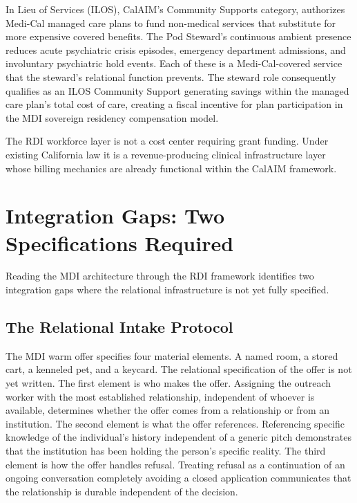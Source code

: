 \documentclass[12pt, letterpaper]{article}
\begin{document}
In Lieu of Services (ILOS), CalAIM's Community Supports category, authorizes Medi-Cal managed care plans to fund non-medical services that substitute for more expensive covered benefits. The Pod Steward's continuous ambient presence reduces acute psychiatric crisis episodes, emergency department admissions, and involuntary psychiatric hold events. Each of these is a Medi-Cal-covered service that the steward's relational function prevents. The steward role consequently qualifies as an ILOS Community Support generating savings within the managed care plan's total cost of care, creating a fiscal incentive for plan participation in the MDI sovereign residency compensation model.

The RDI workforce layer is not a cost center requiring grant funding. Under existing California law it is a revenue-producing clinical infrastructure layer whose billing mechanics are already functional within the CalAIM framework.

\clearpage
\section{Integration Gaps: Two Specifications Required}

Reading the MDI architecture through the RDI framework identifies two integration gaps where the relational infrastructure is not yet fully specified.

\subsection{The Relational Intake Protocol}

The MDI warm offer specifies four material elements. A named room, a stored cart, a kenneled pet, and a keycard. The relational specification of the offer is not yet written. The first element is who makes the offer. Assigning the outreach worker with the most established relationship, independent of whoever is available, determines whether the offer comes from a relationship or from an institution. The second element is what the offer references. Referencing specific knowledge of the individual's history independent of a generic pitch demonstrates that the institution has been holding the person's specific reality. The third element is how the offer handles refusal. Treating refusal as a continuation of an ongoing conversation completely avoiding a closed application communicates that the relationship is durable independent of the decision.
\end{document}

